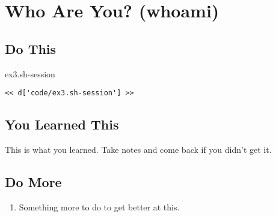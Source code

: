 \chapter{Who Are You? (whoami)}

\section{Do This}

\begin{code}{ex3.sh-session}
\begin{Verbatim}
<< d['code/ex3.sh-session'] >>
\end{Verbatim}
\end{code}


\section{You Learned This}

This is what you learned.  Take notes and come back if you didn't get it.

\section{Do More}

\begin{enumerate}
\item Something more to do to get better at this.
\end{enumerate}

